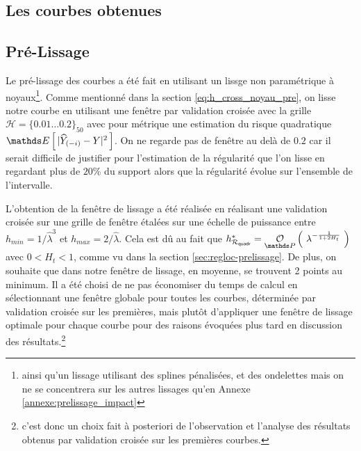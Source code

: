 \subsection{Les courbes obtenues}


\subsection{Pré-Lissage}

Le pré-lissage des courbes a été fait en utilisant un lissge non paramétrique à noyaux\footnote{ainsi qu'un lissage utilisant des splines pénalisées, et des ondelettes mais on ne se concentrera sur les autres lissages qu'en Annexe \ref{annexe:prelissage_impact}}. Comme mentionné dans la section \ref{eq:h_cross_noyau_pre}, on lisse notre courbe en utilisant une fenêtre par validation croisée avec la grille $\mathcal H= \{ 0.01 \dots 0.2 \}_{50}$ avec pour métrique une estimation du risque quadratique $\esperance{|\widehat Y_{(-i)} - Y|^2}$. On ne regarde pas de fenêtre au delà de $0.2$ car il serait difficile de justifier pour l'estimation de la régularité que l'on lisse en regardant plus de $20$\% du support alors que la régularité évolue sur l'ensemble de l'intervalle.

L'obtention de la fenêtre de lissage a été réalisée en réalisant une validation croisée sur une grille de fenêtre étalées sur une échelle de puissance entre $h_{min} = 1 / \widehat \lambda^3$ et $h_{max} = 2 / \widehat \lambda$.
Cela est dû au fait que $h^*_{\mathcal R_{\textsf{quadr}}} = \grandop{ \lambda^{- \frac 1 {1 + 2H_t}} }$ avec $0<H_t<1$, comme vu dans la section \ref{sec:regloc-prelissage}. De plus, on souhaite que dans notre fenêtre de lissage, en moyenne, se trouvent 2 points au minimum. Il a été choisi de ne pas économiser du temps de calcul en sélectionnant une fenêtre globale pour toutes les courbes, déterminée par validation croisée sur les premières, mais plutôt d'appliquer une fenêtre de lissage optimale pour chaque courbe pour des raisons évoquées plus tard en discussion des résultats.\footnote{c'est donc un choix fait à posteriori de l'observation et l'analyse des résultats obtenus par validation croisée sur les premières courbes.}